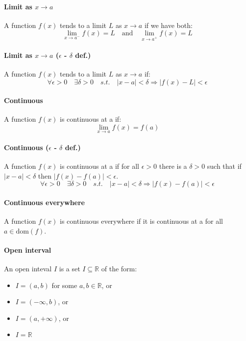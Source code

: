 \documentclass{scrartcl}
\newcommand{\R}{\mathbb{R}}
\begin{document}
\paragraph{Limit as $ x \to a $}
A function $ f(x) $ tends to a limit $ L $ as $ x \to a $ if we have both:
\begin{equation}
\lim_{x \to a^{-}}f(x) = L \quad \textrm{and} \quad \lim_{x \to a^{+}}f(x) = L
\end{equation}

\paragraph{Limit as $ x \to a $ ($ \epsilon $ - $ \delta $ def.)}
A function $ f(x) $ tends to a limit $ L $ as $ x \to a $ if:
\begin{equation}
\forall \epsilon > 0 \quad \exists \delta > 0 \quad s.t. \quad |x - a| < \delta \Rightarrow |f(x) - L| < \epsilon
\end{equation}

\paragraph{Continuous}
A function $ f(x) $ is continuous at a if:
\begin{equation}
\lim_{x \to a}f(x) = f(a)
\end{equation}

\paragraph{Continuous ($ \epsilon $ - $ \delta $ def.)}
A function $ f(x) $ is continuous at a if for all $ \epsilon > 0 $ there is a $ \delta > 0 $ such that if $ |x - a| < \delta $ then $ |f(x) - f(a)| < \epsilon $.
\begin{equation}
\forall \epsilon > 0 \quad \exists \delta > 0 \quad s.t. \quad |x - a| < \delta \Rightarrow |f(x) - f(a)| < \epsilon
\end{equation}

\paragraph{Continuous everywhere}
A function $ f(x) $ is continuous everywhere if it is continuous at a for all $ a \in \textrm{dom}(f) $.

\paragraph{Open interval}
An open inteval $ I $ is a set $ I \subseteq \R $ of the form:
\begin{itemize}
\item $ I = (a, b) $ for some $ a, b \in \R $, or
\item $ I = (-\infty, b) $, or
\item $ I = (a, +\infty) $, or
\item $ I = \R $
\end{itemize}
\end{document}
